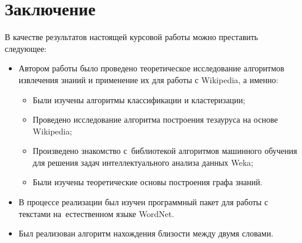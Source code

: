 \section{Заключение}
В качестве результатов настоящей курсовой работы можно преставить следующее:
\begin{itemize}
\item{Автором работы было проведено теоретическое исследование алгоритмов извлечения знаний и применение их для работы с Wikipedia,
 а именно: 
 \begin{itemize}
\item{Были изучены алгоритмы классификации и кластеризации;}
\item{Проведено исследование алгоритма построения тезауруса на основе Wikipedia;}
\item{Произведено знакомство с~библиотекой алгоритмов машинного обучения для решения задач интеллектуального анализа данных Weka;}
\item{Были изучены теоретические основы построения графа знаний.}
 \end{itemize}}
\item{В процессе реализации был изучен программный пакет для работы с текстами на~естественном языке WordNet.}
\item{Был реализован алгоритм нахождения близости между двумя словами.}
\end{itemize}
